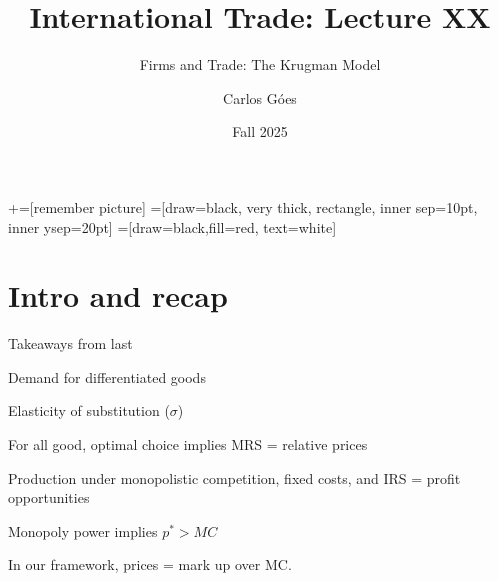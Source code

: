 \documentclass[notes,11pt, aspectratio=169, xcolor=table]{beamer}
\title[]{International Trade: Lecture XX}
\subtitle[]{Firms and Trade: The Krugman Model}
\author[Góes]
{Carlos Góes\inst{1}}
\date{Fall 2025}
\institute[GWU]{\inst{1} George Washington University }
\newenvironment{wideitemize}{\itemize\addtolength{\itemsep}{10pt}}{\enditemize}
\begin{document}
\newcommand\marktopleft[1]{%
    \tikz[overlay,remember picture] 
        \node (marker-#1-a) at (-.3em,.3em) {};%
}
\newcommand\markbottomright[2]{%
    \tikz[overlay,remember picture] 
        \node (marker-#1-b) at (0em,0em) {};%
}
+=[remember picture] 
 =[draw=black, very thick, rectangle, inner sep=10pt, inner ysep=20pt]
 =[draw=black,fill=red, text=white]















\frame{\titlepage}
\addtocounter{framenumber}{-1}

\section{Intro and recap}

\begin{frame}{Takeaways from last}
\begin{wideitemize}
    \item Demand for differentiated goods
    \item Elasticity of substitution ($\sigma$)
    \item For all good, optimal choice implies MRS = relative prices
    \item Production under monopolistic competition, fixed costs, and IRS = profit opportunities
    \item Monopoly power implies $p^* > MC$
    \item In our framework, prices = mark up over MC.
    \end{wideitemize}
 \end{frame}
\end{document}

